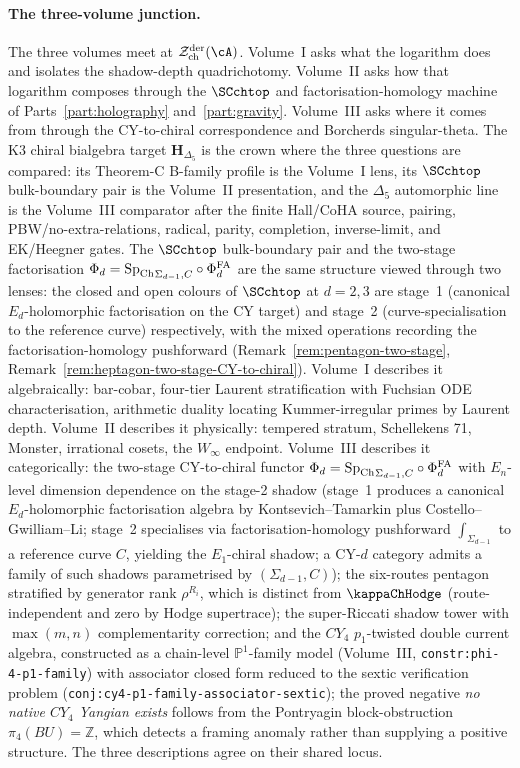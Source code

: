 \paragraph{The three-volume junction.}
The three volumes meet at $\cZ^{\mathrm{der}}_{\mathrm{ch}}(\cA)$.
Volume~I asks what the logarithm does and isolates the
shadow-depth quadrichotomy. Volume~II asks how that logarithm composes
through the $\SCchtop$ and factorisation-homology machine of
Parts~\ref{part:holography} and~\ref{part:gravity}. Volume~III asks
where it comes from through the CY-to-chiral correspondence
and Borcherds singular-theta. The K3 chiral bialgebra target
$\mathbf{H}_{\Delta_5}$ is the crown where the three questions are
compared: its Theorem-C B-family profile is the Volume~I lens, its
$\SCchtop$ bulk-boundary pair is the Volume~II presentation, and the
$\Delta_5$ automorphic line is the Volume~III comparator after the
finite Hall/CoHA source, pairing, PBW/no-extra-relations, radical,
parity, completion, inverse-limit, and EK/Heegner gates. The
$\SCchtop$ bulk-boundary pair and the two-stage factorisation
$\Phi_d = {\mathrm{Sp}_{\mathrm{Ch}}}_{\Sigma_{d-1},C}\circ\Phi^{\mathrm{FA}}_d$ are the same
structure viewed through two lenses: the closed and open colours of
$\SCchtop$ at $d = 2, 3$ are stage~1 (canonical $E_d$-holomorphic
factorisation on the CY target) and stage~2 (curve-specialisation
to the reference curve) respectively, with the mixed operations
recording the factorisation-homology pushforward
(Remark~\ref{rem:pentagon-two-stage},
Remark~\ref{rem:heptagon-two-stage-CY-to-chiral}).
Volume~I describes it algebraically: bar-cobar, four-tier Laurent
stratification with Fuchsian ODE characterisation, arithmetic
duality locating Kummer-irregular primes by Laurent depth.
Volume~II describes it physically: tempered stratum,
Schellekens 71, Monster, irrational cosets, the $W_\infty$
endpoint. Volume~III describes it categorically: the
two-stage CY-to-chiral functor
$\Phi_d = {\mathrm{Sp}_{\mathrm{Ch}}}_{\Sigma_{d-1},C}\circ\Phi^{\mathrm{FA}}_d$ with
$E_n$-level dimension dependence on the stage-2 shadow
(stage~1 produces a canonical $E_d$-holomorphic factorisation
algebra by Kontsevich--Tamarkin plus Costello--Gwilliam--Li;
stage~2 specialises via factorisation-homology pushforward
$\int_{\Sigma_{d-1}}$ to a reference curve $C$, yielding the
$E_1$-chiral shadow; a CY-$d$ category admits a family of
such shadows parametrised by $(\Sigma_{d-1}, C)$); the
six-routes pentagon stratified by generator rank
$\rho^{R_i}$, which is distinct from $\kappaChHodge$
(route-independent and zero by Hodge supertrace); the
super-Riccati shadow tower with $\max(m, n)$ complementarity
correction; and the $CY_4$ $p_1$-twisted double current algebra,
constructed as a chain-level $\mathbb{P}^1$-family model
(Volume~III, \texttt{constr:phi-4-p1-family}) with associator
closed form reduced to the sextic verification problem
(\texttt{conj:cy4-p1-family-associator-sextic}); the proved
negative \emph{no native $CY_4$ Yangian exists} follows from the
Pontryagin block-obstruction $\pi_4(BU) = \mathbb{Z}$, which
detects a framing anomaly rather than supplying a positive
structure. The three descriptions agree on their shared locus.


